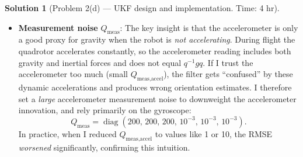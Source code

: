 \documentclass[11pt, reqno, letterpaper]{amsart}
\theoremstyle{plain}
\theoremstyle{definition}
\newtheorem{solution}[theorem]{Solution}
\begin{document}
\begin{solution}[Problem 2(d) — UKF design and implementation. Time: 4 hr]
\begin{itemize}
  \item \textbf{Measurement noise} $Q_\text{meas}$:
    The key insight is that the accelerometer is only a good proxy for
    gravity when the robot is \emph{not accelerating}.
    During flight the quadrotor accelerates constantly, so the accelerometer
    reading includes both gravity and inertial forces and does not equal
    $q^{-1}gq$.
    If I trust the accelerometer too much (small $Q_\text{meas,accel}$),
    the filter gets ``confused'' by these dynamic accelerations and produces
    wrong orientation estimates.
    I therefore set a \emph{large} accelerometer measurement noise to
    downweight the accelerometer innovation, and rely primarily on the
    gyroscope:
    \[
      Q_\text{meas} = \operatorname{diag}(200,\,200,\,200,\,
                                          10^{-3},\,10^{-3},\,10^{-3}).
    \]
    In practice, when I reduced $Q_\text{meas,accel}$ to values like 1 or 10,
    the RMSE \emph{worsened} significantly, confirming this intuition.
\end{itemize}
\end{solution}
\end{document}
